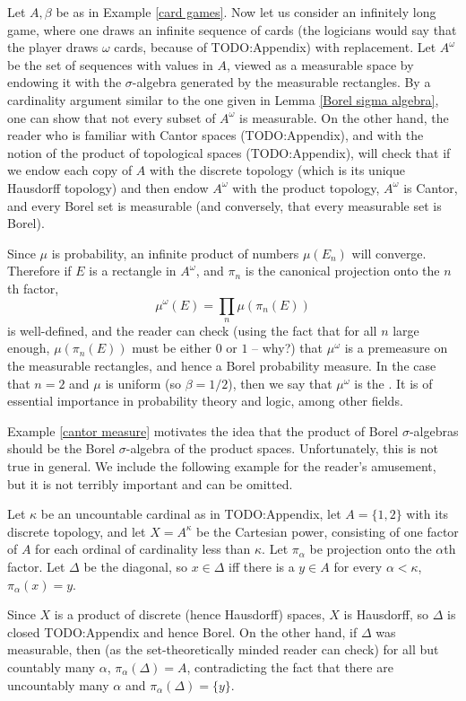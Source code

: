 \begin{example}
\label{cantor measure}
Let $A, \beta$ be as in Example \ref{card games}.
Now let us consider an infinitely long game, where one draws an infinite sequence of cards (the logicians would say that the player draws $\omega$ cards, because of TODO:Appendix) with replacement.
Let $A^\omega$ be the set of sequences with values in $A$, viewed as a measurable space by endowing it with the $\sigma$-algebra generated by the measurable rectangles.
By a cardinality argument similar to the one given in Lemma \ref{Borel sigma algebra}, one can show that not every subset of $A^\omega$ is measurable.
On the other hand, the reader who is familiar with Cantor spaces (TODO:Appendix), and with the notion of the product of topological spaces (TODO:Appendix), will check that if we endow each copy of $A$ with the discrete topology (which is its unique Hausdorff topology) and then endow $A^\omega$ with the product topology, $A^\omega$ is Cantor, and every Borel set is measurable (and conversely, that every measurable set is Borel).

Since $\mu$ is probability, an infinite product of numbers $\mu(E_n)$ will converge. Therefore if $E$ is a rectangle in $A^\omega$, and $\pi_n$ is the canonical projection onto the $n$th factor,
$$\mu^\omega(E) = \prod_n \mu(\pi_n(E))$$
is well-defined, and the reader can check (using the fact that for all $n$ large enough, $\mu(\pi_n(E))$ must be either $0$ or $1$ -- why?) that $\mu^\omega$ is a premeasure on the measurable rectangles, and hence a Borel probability measure.
In the case that $n = 2$ and $\mu$ is uniform (so $\beta = 1/2$), then we say that $\mu^\omega$ is the .
It is of essential importance in probability theory and logic, among other fields.
\end{example}

Example \ref{cantor measure} motivates the idea that the product of Borel $\sigma$-algebras should be the Borel $\sigma$-algebra of the product spaces.
Unfortunately, this is not true in general.
We include the following example for the reader's amusement, but it is not terribly important and can be omitted.

\begin{example}
Let $\kappa$ be an uncountable cardinal as in TODO:Appendix, let $A = \{1, 2\}$ with its discrete topology, and let $X = A^\kappa$ be the Cartesian power, consisting of one factor of $A$ for each ordinal of cardinality less than $\kappa$. Let $\pi_\alpha$ be projection onto the $\alpha$th factor.
Let $\Delta$ be the diagonal, so $x \in \Delta$ iff there is a $y \in A$ for every $\alpha < \kappa$, $\pi_\alpha(x) = y$.

Since $X$ is a product of discrete (hence Hausdorff) spaces, $X$ is Hausdorff, so $\Delta$ is closed TODO:Appendix and hence Borel.
On the other hand, if $\Delta$ was measurable, then (as the set-theoretically minded reader can check) for all but countably many $\alpha$, $\pi_\alpha(\Delta) = A$, contradicting the fact that there are uncountably many $\alpha$ and $\pi_\alpha(\Delta) = \{y\}$.
\end{example}

